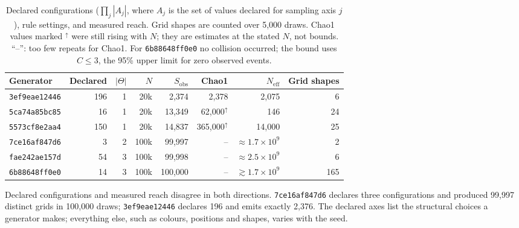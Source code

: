 \documentclass[11pt]{article}
\newcommand{\gen}[1]{\texttt{#1}}
\begin{document}
\begin{table}[H]
\centering
\small
\begin{tabular}{lrrrrrrr}
\toprule
Generator & Declared & $|\Theta|$ & $N$ & $S_{\mathrm{obs}}$ & Chao1 & $N_{\mathrm{eff}}$ & Grid shapes \\
\midrule
\gen{3ef9eae12446} & 196 & 1 & 20k & 2,374 & 2,378 & 2,075 & 6 \\
\gen{5ca74a85bc85} & 16 & 1 & 20k & 13,349 & 62,000$^{\uparrow}$ & 146 & 24 \\
\gen{5573cf8e2aa4} & 150 & 1 & 20k & 14,837 & 365,000$^{\uparrow}$ & 14,000 & 25 \\
\gen{7ce16af847d6} & 3 & 2 & 100k & 99,997 & -- & $\approx1.7\times10^{9}$ & 2 \\
\gen{fae242ae157d} & 54 & 3 & 100k & 99,998 & -- & $\approx2.5\times10^{9}$ & 6 \\
\gen{6b88648ff0e0} & 14 & 3 & 100k & 100,000 & -- & $\gtrsim1.7\times10^{9}$ & 165 \\
\bottomrule
\end{tabular}
\caption{Declared configurations ($\prod_j|A_j|$, where $A_j$ is the set of
values declared for sampling axis $j$), rule settings, and measured
reach. Grid shapes are counted over 5,000 draws. Chao1 values marked
$^{\uparrow}$ were still rising with $N$; they are estimates at the stated $N$,
not bounds. ``--'': too few repeats for Chao1. For
\gen{6b88648ff0e0} no collision occurred; the bound uses $C\le3$, the 95\%
upper limit for zero observed events.}
\end{table}

Declared configurations and measured reach disagree in both directions.
\gen{7ce16af847d6} declares three configurations and produced 99,997 distinct
grids in 100,000 draws; \gen{3ef9eae12446} declares 196 and emits exactly
2,376. The declared axes list the structural choices a generator makes;
everything else, such as colours, positions and shapes, varies with the seed.
\end{document}
